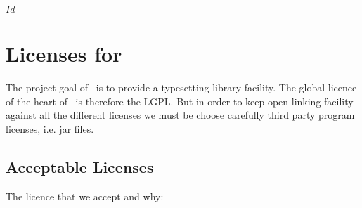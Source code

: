 \SVN$Id$
\chapter{Licenses for \ExTeX}
%

The project goal of \ExTeX\ is to provide a typesetting library
facility.  The global licence of the heart of \ExTeX\ is therefore the
LGPL. But in order to keep open linking facility against all the
different licenses we must be choose carefully third party program
licenses, i.e. jar files.

\section{Acceptable Licenses}

The licence that we accept and why:

